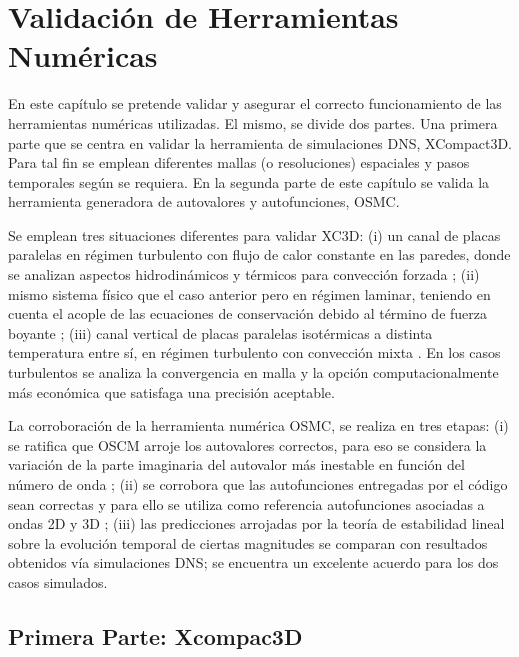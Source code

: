 \chapter{Validación de Herramientas Numéricas} \label{cap:validacion}


En este capítulo se pretende validar y asegurar el correcto funcionamiento de las herramientas numéricas utilizadas. El mismo, se divide dos partes. Una primera parte que se centra en validar la herramienta de simulaciones DNS, XCompact3D. Para tal fin se emplean diferentes mallas (o resoluciones) espaciales y pasos temporales según se requiera. En la segunda parte de este capítulo se valida la herramienta generadora de autovalores y autofunciones, OSMC.

Se emplean tres situaciones diferentes para validar XC3D: (i) un canal de placas paralelas en régimen turbulento con flujo de calor constante en las paredes, donde se analizan aspectos hidrodinámicos y térmicos para convección forzada \cite{moser1999, kawamura2000dns}; (ii) mismo sistema físico que el caso anterior pero en régimen laminar, teniendo en cuenta el acople de las ecuaciones de conservación debido al término de fuerza boyante \linebreak \cite{chen1996linear}; (iii) canal vertical de placas paralelas isotérmicas a distinta temperatura entre sí, en régimen  turbulento con convección mixta \cite{guo2022direct}. En los casos turbulentos se analiza la convergencia en malla y la opción computacionalmente más económica que satisfaga una precisión aceptable.

La corroboración de la herramienta numérica OSMC, se realiza en tres etapas: (i) se ratifica que OSCM arroje los autovalores correctos, para eso se considera la variación de la parte imaginaria del autovalor más inestable en función del número de onda \cite{chen1996linear}; (ii) se corrobora que las autofunciones entregadas por el código sean correctas y para ello se utiliza como referencia autofunciones asociadas a ondas 2D y 3D \cite{chen2003direct}; (iii) las predicciones arrojadas por la teoría de estabilidad lineal sobre la evolución temporal de ciertas magnitudes se comparan con resultados obtenidos vía simulaciones DNS; se encuentra un excelente acuerdo para los dos casos simulados.


\newpage
 
\section{Primera Parte: Xcompac3D}

